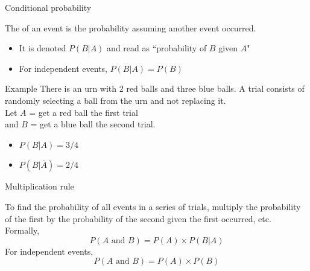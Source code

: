 \documentclass[xcolor=table, handout]{beamer}
\begin{document}
\begin{frame}{Conditional probability}
\begin{block}{}
\large The  of an event is the probability assuming another event occurred. 
\begin{itemize}
\pause
\item It is denoted $P(B|A)$ and read as ``probability of $B$ given $A$"
\pause
\item For independent events, $P(B|A) = P(B)$
\end{itemize}
\end{block}

\pause

\begin{exampleblock}{Example}
There is an urn with 2 red balls and three blue balls. A trial consists of randomly selecting a ball from the urn and not replacing it.\\
Let $A$ = get a red ball the first trial\\
 and $B$ = get a blue ball the second trial.
\begin{itemize}
\pause
\item $P(B | A) = 3 / 4$
\pause
\item $P(B | \bar A) =  2 / 4$
\end{itemize}

\end{exampleblock}
\end{frame}

\begin{frame}{Multiplication rule}
\begin{block}{}
To find the probability of all events in a series of trials, multiply the probability of the first by the probability of the second given the first occurred, etc.\\
\medskip
\pause
Formally,
\[P(A \text{ and } B) = P(A) \times P(B|A)\]
\pause
For independent events,
\[P(A \text{ and } B) = P(A) \times P(B)\]
\end{block}
\end{frame}
\end{document}
